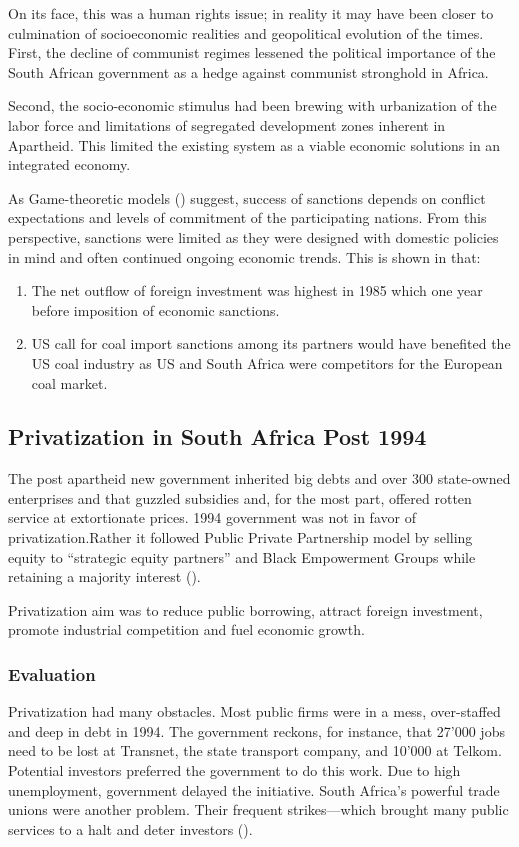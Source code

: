\documentclass{elsarticle}
\begin{document}
On its face, this was a human rights issue; in reality it may have been closer to culmination of socioeconomic realities and geopolitical evolution of the times. First, the decline of communist regimes lessened the political importance of the South African government as a hedge against communist stronghold in Africa. 

Second, the socio-economic stimulus had been brewing with urbanization of the labor force and limitations of segregated development zones inherent in Apartheid. This limited the existing system as a viable economic solutions in an integrated economy.

As Game-theoretic models (\cite{Kaempfer2007}) suggest, success of sanctions depends on conflict expectations and levels of commitment of the participating nations. From this perspective, sanctions were limited as they were designed with domestic policies in mind and often continued ongoing economic trends. This is shown in that:

\begin{enumerate}
    \item The net outflow of foreign investment was highest in 1985 which one year before imposition of economic sanctions.
    \item US call for coal import sanctions among its partners would have benefited the US coal industry as US and South Africa were competitors for the European coal market.
\end{enumerate}

\subsection{Privatization in South Africa Post 1994}
The post apartheid new government inherited big debts and over 300 state-owned enterprises and that guzzled subsidies and, for the most part, offered rotten service at extortionate prices.
1994 government was not in favor of privatization.Rather it followed Public Private Partnership model by selling equity to ``strategic equity partners'' and Black Empowerment Groups while retaining a majority interest (\cite{Jerome2004}). 

Privatization aim was to reduce public borrowing, attract foreign investment, promote industrial competition and fuel economic growth.

\subsubsection{Evaluation}
Privatization had many obstacles. Most public firms were in a mess, over-staffed and deep in debt in 1994. The government reckons, for instance, that 27'000 jobs need to be lost at Transnet, the state transport company, and 10'000 at Telkom. Potential investors preferred the government to do this work. Due to high unemployment, government delayed the initiative. South Africa's powerful trade unions were another problem. Their frequent strikes—which brought many public services to a halt and deter investors (\cite{Economist1999}).
\end{document}
